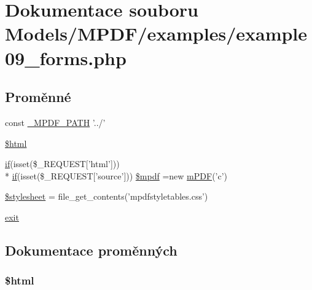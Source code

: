 \hypertarget{example09__forms_8php}{\section{Dokumentace souboru Models/\-M\-P\-D\-F/examples/example09\-\_\-forms.php}
\label{example09__forms_8php}
}
\subsection*{Proměnné}
\begin{DoxyCompactItemize}
\item 
const \hyperlink{example09__forms_8php_a79734099b3f1817b14687db06cde3132}{\-\_\-\-M\-P\-D\-F\-\_\-\-P\-A\-T\-H} '../'
\item 
\hyperlink{example09__forms_8php_a6f96e7fc92441776c9d1cd3386663b40}{\$html}
\item 
\hyperlink{pdf__parser_8php_af8105e84b42a9ceda5357caeb6c4760b}{if}(isset(\$\-\_\-\-R\-E\-Q\-U\-E\-S\-T\mbox{[}'html'\mbox{]})) \\*
\hyperlink{pdf__parser_8php_af8105e84b42a9ceda5357caeb6c4760b}{if}(isset(\$\-\_\-\-R\-E\-Q\-U\-E\-S\-T\mbox{[}'source'\mbox{]})) \hyperlink{example09__forms_8php_a81626621a7353594653854d6441ac65c}{\$mpdf} =new \hyperlink{classm_p_d_f}{m\-P\-D\-F}('c')
\item 
\hyperlink{example09__forms_8php_a19e5cf73e817c55a49205e6ec78c88a8}{\$stylesheet} = file\-\_\-get\-\_\-contents('mpdfstyletables.\-css')
\item 
\hyperlink{example09__forms_8php_a6733eb5f605d09eaede9845835d71c4e}{exit}
\end{DoxyCompactItemize}


\subsection{Dokumentace proměnných}
\hypertarget{example09__forms_8php_a6f96e7fc92441776c9d1cd3386663b40}{
\subsubsection[{\$html}]{\setlength{\rightskip}{0pt plus 5cm}\$html}}\label{example09__forms_8php_a6f96e7fc92441776c9d1cd3386663b40}


